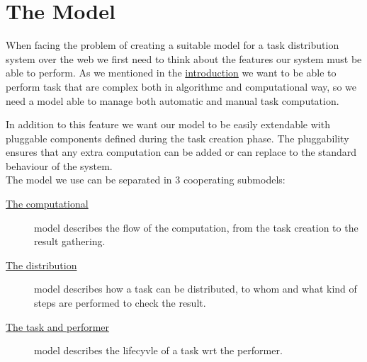 
\chapter{The Model}
\label{cap:model}

When facing the problem of creating a suitable model for a task distribution system over the web
we first need to think about the features our system must be able to perform.
As we mentioned in the \hyperref[intro]{introduction} we want to be able to perform task that are complex both in
algorithmc and computational way, so we need a model able to manage both automatic and
manual task computation.

In addition to this feature we want our model to be easily extendable with pluggable components
defined during the task creation phase. The pluggability ensures that any extra computation can be 
added or can replace to the standard behaviour of the system.\\


The model we use can be separated in 3 cooperating submodels:
\begin{description}
	\item[{\hyperref[sec:model:computation]{The computational}}] model describes the flow of
	the computation, from the task creation to the result gathering.

	\item[{\hyperref[sec:model:distribution]{The distribution}}] model describes how a task
	can be distributed, to whom and what kind of steps are performed to check the result.
	
	\item[{\hyperref[sec:model:performer]{The task and performer}}] model describes the
	lifecyvle of a task wrt the performer.
\end{description}



